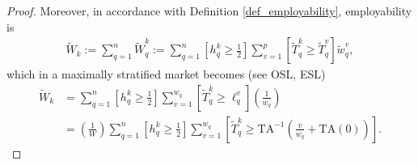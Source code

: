 \documentclass[hidelinks, nonatbib]{elsarticle}
\begin{document}
\begin{get_theorem}[GET]
\begin{proof}
        Moreover, in accordance with Definition \ref{def_employability}, employability is
        \begin{gather}
            \tilde{W}_{k}
            :=
            \sum_{q=1}^{n}
            \tilde{W}_{q}^{k}
            :=
            \sum_{q=1}^{n}
            \left[
                h_{q}^{k}
                \geq
                \frac{1}{2}
            \right]
            \sum_{v=1}^{p}
            \left[
                \tilde{T}_{q}^{k}
                \geq
                \tilde{T}_{q}^{v}
            \right]
            \tilde{w}_{q}^{v}
            ,
        \end{gather}
        which in a maximally stratified market becomes (see OSL, ESL)
        \begin{align}
            \tilde{W}_{k}
            &=
            \sum_{q=1}^{n}
            \left[
                h_{q}^{k}
                \geq
                \frac{1}{2}
            \right]
            \sum_{v=1}^{w_q}
            \left[
                \tilde{T}_{q}^{k}
                \geq
                \ell_{q}^{v}
            \right]
            \left(
                \frac{1}{w_q}
            \right)
            \\
            &=
            \left(
                \frac{1}{W}
            \right)
            \sum_{q=1}^{n}
            \left[
                h_{q}^{k}
                \geq
                \frac{1}{2}
            \right]
            \sum_{v=1}^{w_q}
            \left[
                \tilde{T}_{q}^{k}
                \geq
                \text{TA}^{-1}
                \left(
                    \frac{v}{w_q}
                    +
                    \text{TA}(0)
                \right)
            \right]
            .
        \end{align}
    \end{proof}
\end{get_theorem}
\end{document}
